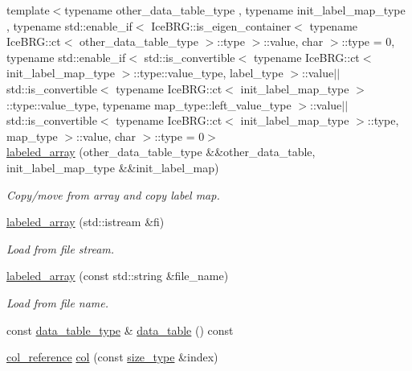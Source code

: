 \begin{DoxyCompactItemize}
{\footnotesize template$<$typename other\+\_\+data\+\_\+table\+\_\+type , typename init\+\_\+label\+\_\+map\+\_\+type , typename std\+::enable\+\_\+if$<$ Ice\+B\+R\+G\+::is\+\_\+eigen\+\_\+container$<$ typename Ice\+B\+R\+G\+::ct$<$ other\+\_\+data\+\_\+table\+\_\+type $>$\+::type $>$\+::value, char $>$\+::type  = 0, typename std\+::enable\+\_\+if$<$ std\+::is\+\_\+convertible$<$ typename Ice\+B\+R\+G\+::ct$<$ init\+\_\+label\+\_\+map\+\_\+type $>$\+::type\+::value\+\_\+type, label\+\_\+type $>$\+::value$\vert$$\vert$                                                       std\+::is\+\_\+convertible$<$ typename Ice\+B\+R\+G\+::ct$<$ init\+\_\+label\+\_\+map\+\_\+type $>$\+::type\+::value\+\_\+type, typename map\+\_\+type\+::left\+\_\+value\+\_\+type $>$\+::value$\vert$$\vert$std\+::is\+\_\+convertible$<$ typename Ice\+B\+R\+G\+::ct$<$ init\+\_\+label\+\_\+map\+\_\+type $>$\+::type, map\+\_\+type $>$\+::value, char $>$\+::type  = 0$>$ }\\\hyperlink{classIceBRG_1_1labeled__array_aba48df814d51c2b0f665ad22818b13d4}{labeled\+\_\+array} (other\+\_\+data\+\_\+table\+\_\+type \&\&other\+\_\+data\+\_\+table, init\+\_\+label\+\_\+map\+\_\+type \&\&init\+\_\+label\+\_\+map)
\begin{DoxyCompactList}\small\item\em Copy/move from array and copy label map. \end{DoxyCompactList}\item 
\hyperlink{classIceBRG_1_1labeled__array_a7b261ea12e9138e54f90969eadfd8b33}{labeled\+\_\+array} (std\+::istream \&fi)
\begin{DoxyCompactList}\small\item\em Load from file stream. \end{DoxyCompactList}\item 
\hyperlink{classIceBRG_1_1labeled__array_ad6d72a71b3dae8788353a7e2c458b539}{labeled\+\_\+array} (const std\+::string \&file\+\_\+name)
\begin{DoxyCompactList}\small\item\em Load from file name. \end{DoxyCompactList}\item 
const \hyperlink{classIceBRG_1_1labeled__array_a43d1c710fe591f9610ab9e9827aabba6}{data\+\_\+table\+\_\+type} \& \hyperlink{classIceBRG_1_1labeled__array_aaed5ce56dc807bffbf7d5521d0e6fc2f}{data\+\_\+table} () const 
\item 
\hyperlink{classIceBRG_1_1labeled__array_aa7217b6c3b4a663d16f579aebab5e5cf}{col\+\_\+reference} \hyperlink{classIceBRG_1_1labeled__array_a9d86679af14cc5718a943abaa4a67616}{col} (const \hyperlink{lib_2IceBRG__main_2common_8h_a566c61f2ca17211f4ba8557f3f65e8d3}{size\+\_\+type} \&index)

\end{DoxyCompactItemize}
